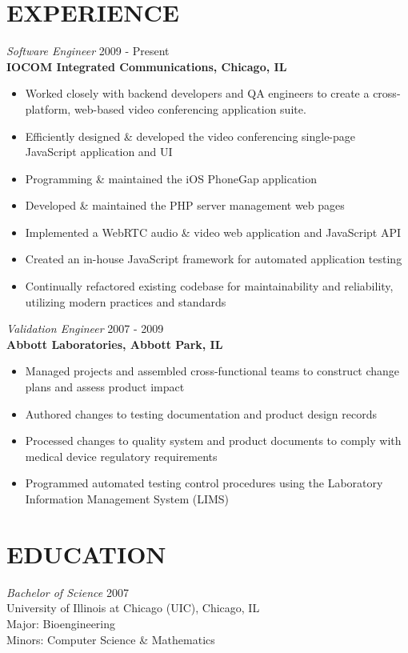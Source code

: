 \documentclass[margin]{res}
\begin{document}
\begin{resume}
\section{EXPERIENCE}
{\sl Software Engineer} \hfill 2009 - Present \\
\smallskip
{\bf IOCOM Integrated Communications, Chicago, IL}

\begin{itemize} \itemsep -1pt
\item Worked closely with backend developers and QA engineers to create a cross-platform, web-based video conferencing application suite.
\item Efficiently designed \& developed the video conferencing single-page JavaScript application and UI
\item Programming \& maintained the iOS PhoneGap application
\item Developed \& maintained the PHP server management web pages
\item Implemented a WebRTC audio \& video web application and JavaScript API
\item Created an in-house JavaScript framework for automated application testing
\item Continually refactored existing codebase for maintainability and
  reliability, utilizing modern practices and standards
\end{itemize}

{\sl Validation Engineer} \hfill 2007 - 2009 \\
{\bf Abbott Laboratories, Abbott Park, IL}
\smallskip

\begin{itemize} \itemsep -1pt
\item Managed projects and assembled cross-functional teams to construct change plans and assess product impact
\item Authored changes to testing documentation and product design records
\item Processed changes to quality system and product documents to comply with medical device regulatory requirements
\item Programmed automated testing control procedures using the Laboratory Information Management System (LIMS)
\end{itemize}

\section{EDUCATION}
{\sl Bachelor of Science} \hfill 2007 \\
University of Illinois at Chicago (UIC), Chicago, IL \\
Major: Bioengineering \\
Minors: Computer Science \& Mathematics 

\end{resume}
\end{document}
